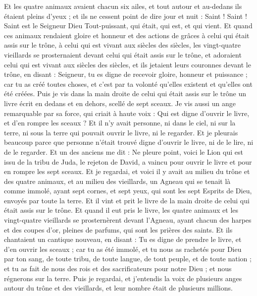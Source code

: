 \begin{multicols}{2}
Et les quatre animaux avaient chacun six ailes, et tout autour et au-dedans ils étaient pleins d'yeux ; et ils ne cessent point de dire jour et nuit : Saint ! Saint ! Saint est le Seigneur Dieu Tout-puissant, qui était, qui est, et qui vient.
Et quand ces animaux rendaient gloire et honneur et des actions de grâces à celui qui était assis sur le trône, à celui qui est vivant aux siècles des siècles,
les vingt-quatre vieillards se prosternaient devant celui qui était assis sur le trône, et adoraient celui qui est vivant aux siècles des siècles, et ils jetaient leurs couronnes devant le trône, en disant :
Seigneur, tu es digne de recevoir gloire, honneur et puissance ; car tu as créé toutes choses, et c'est par ta volonté qu'elles existent et qu'elles ont été créées.
\VerseOne{}Puis je vis dans la main droite de celui qui était assis sur le trône un livre écrit en dedans et en dehors, scellé de sept sceaux.
Je vis aussi un ange remarquable par sa force, qui criait à haute voix : Qui est digne d'ouvrir le livre, et d'en rompre les sceaux ?
Et il n’y avait personne, ni dans le ciel, ni sur la terre, ni sous la terre qui pouvait ouvrir le livre, ni le regarder.
Et je pleurais beaucoup parce que personne n'était trouvé digne d'ouvrir le livre, ni de le lire, ni de le regarder.
Et un des anciens me dit : Ne pleure point, voici le Lion qui est issu de la tribu de Juda, le rejeton de David, a vaincu pour ouvrir le livre et pour en rompre les sept sceaux.
Et je regardai, et voici il y avait au milieu du trône et des quatre animaux, et au milieu des vieillards, un Agneau qui se tenait là comme immolé, ayant sept cornes, et sept yeux, qui sont les sept Esprits de Dieu, envoyés par toute la terre.
Et il vint et prit le livre de la main droite de celui qui était assis sur le trône.
Et quand il eut pris le livre, les quatre animaux et les vingt-quatre vieillards se prosternèrent devant l'Agneau, ayant chacun des harpes et des coupes d'or, pleines de parfums, qui sont les prières des saints.
Et ils chantaient un cantique nouveau, en disant : Tu es digne de prendre le livre, et d'en ouvrir les sceaux ; car tu as été immolé, et tu nous as rachetés pour Dieu par ton sang, de toute tribu, de toute langue, de tout peuple, et de toute nation ;
et tu as fait de nous des rois et des sacrificateurs pour notre Dieu ; et nous régnerons sur la terre.
Puis je regardai, et j'entendis la voix de plusieurs anges autour du trône et des vieillards, et leur nombre était de plusieurs millions.

\end{multicols}
